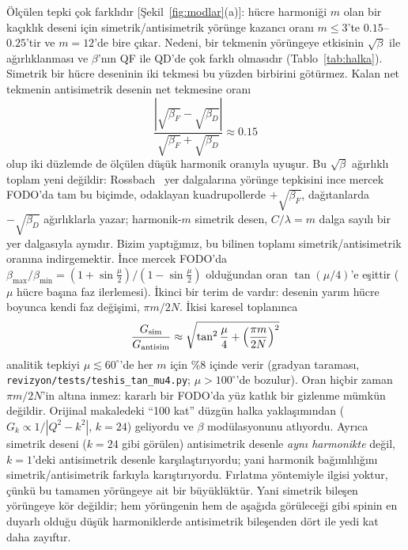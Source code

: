 \documentclass[12pt,a4paper]{extarticle}
\begin{document}
Ölçülen tepki çok farklıdır [Şekil~\ref{fig:modlar}(a)]: hücre harmoniği $m$ olan bir kaçıklık deseni için
simetrik/antisimetrik yörünge kazancı oranı $m\le3$'te $0.15$--$0.25$'tir ve $m=12$'de bire çıkar. Nedeni, bir
tekmenin yörüngeye etkisinin $\sqrt{\beta}$ ile ağırlıklanması ve $\beta$'nın QF ile QD'de çok farklı olmasıdır
(Tablo~\ref{tab:halka}). Simetrik bir hücre deseninin iki tekmesi bu yüzden birbirini götürmez. Kalan net
tekmenin antisimetrik desenin net tekmesine oranı
\begin{equation}
\frac{|\sqrt{\beta_F}-\sqrt{\beta_D}|}{\sqrt{\beta_F}+\sqrt{\beta_D}}\approx0.15
\end{equation}
olup iki düzlemde de ölçülen düşük harmonik oranıyla uyuşur. Bu $\sqrt{\beta}$ ağırlıklı toplam yeni değildir:
Rossbach~\cite{rossbach} yer dalgalarına yörünge tepkisini ince mercek FODO'da tam bu biçimde, odaklayan
kuadrupollerde $+\sqrt{\beta_F}$, dağıtanlarda $-\sqrt{\beta_D}$ ağırlıklarla yazar; harmonik-$m$ simetrik
desen, $C/\lambda=m$ dalga sayılı bir yer dalgasıyla aynıdır. Bizim yaptığımız, bu bilinen toplamı
simetrik/antisimetrik oranına indirgemektir. İnce mercek FODO'da $\beta_\text{max}/\beta_\text{min}=
(1+\sin\frac{\mu}{2})/(1-\sin\frac{\mu}{2})$ olduğundan oran $\tan(\mu/4)$'e eşittir ($\mu$ hücre başına faz
ilerlemesi). İkinci bir terim de vardır: desenin yarım hücre boyunca kendi faz değişimi, $\pi m/2N$. İkisi
karesel toplanınca
\begin{equation}
\frac{G_\text{sim}}{G_\text{antisim}}\approx\sqrt{\tan^2\frac{\mu}{4}+\Bigl(\frac{\pi m}{2N}\Bigr)^2}
\end{equation}
analitik tepkiyi $\mu\lesssim60^\circ$'de her $m$ için \%8 içinde verir (gradyan taraması,
\texttt{revizyon/tests/teshis\_tan\_mu4.py}; $\mu>100^\circ$'de bozulur). Oran hiçbir zaman $\pi m/2N$'in altına
inmez: kararlı bir FODO'da yüz katlık bir gizlenme mümkün değildir. Orijinal makaledeki ``100 kat'' düzgün halka
yaklaşımından ($G_k\propto1/|Q^2-k^2|$, $k=24$) geliyordu ve $\beta$ modülasyonunu atlıyordu. Ayrıca simetrik
deseni ($k=24$ gibi görülen) antisimetrik desenle \emph{aynı harmonikte} değil, $k=1$'deki antisimetrik desenle
karşılaştırıyordu; yani harmonik bağımlılığını simetrik/antisimetrik farkıyla karıştırıyordu. Fırlatma
yöntemiyle ilgisi yoktur, çünkü bu tamamen yörüngeye ait bir büyüklüktür. Yani simetrik bileşen yörüngeye kör değildir;
hem yörüngenin hem de aşağıda görüleceği gibi spinin en duyarlı olduğu düşük harmoniklerde antisimetrik
bileşenden dört ile yedi kat daha zayıftır.
\end{document}

